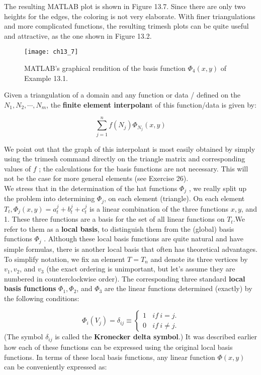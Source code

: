 \documentclass[../main.tex]{subfiles}
\begin{document}
The resulting MATLAB plot is shown in Figure 13.7. Since there are only two 
heights for the edges, the coloring is not very elaborate. With finer triangulations and more complicated functions, the resulting trimesh plots can be quite useful and attractive, as the one shown in Figure 13.2. 

\begin{figure}[H]
	\centering
	\texttt{[image: ch13\_7]}
	\caption{\textsf{MATLAB's graphical rendition of the basis function $\Phi_4(x,y)$ of Example 13.1. }}
	\label{pfig:ch13_7}
\end{figure}
Given a triangulation of a domain and any function or data / defined on the 
 $N_1, N_2, \cdots, N_m$, the \textbf{finite element interpolan}t of this function/data is given by: 

$$ \sum_{j=1}^{n} f(N_j) \Phi_{N_j}(x,y)$$

We point out that the graph of this interpolant is most easily obtained by simply using the trimesh command directly on the triangle matrix and corresponding values of $f$ ; the calculations for the basis functions are not necessary. This will not be the case for more general elements (see Exercise 26). 
\\

We stress that in the determination of the hat functions $\Phi_j$ , we really split up the problem into determining $\Phi_j$, on each element (triangle). On each element $T_t, \Phi_j(x,y)=a_t^j+b_t^j+c_t^j$ is a linear combination of the three functions $x,y$, and 1. These three functions are a basis for the set of all linear functions on $T_t$.We refer to them as a \textbf{local basis}, to distinguish them from the (global) basis functions $\Phi_j$ . Although these local basis functions are quite natural and have simple formulas, there is another local basis that often has theoretical advantages. To simplify notation, we fix an element $T = T_n$ and denote its three vertices by 
$v_1,v_2$, and $v_3$ (the exact ordering is unimportant, but let's assume they are numbered in counterclockwise order). The corresponding three standard \textbf{local basis functions} $\Phi _1,\Phi_2$, and $\Phi_3$ are the linear functions determined (exactly) by the following conditions: 

\begin{equation}\label{eqa7}
	\Phi_i(V_j)=\delta_{ij}\equiv 
			\begin{cases}
				1~~~~if~i=j.\\
				0~~~~if~i\neq j.
			\end{cases}
\end{equation}
(The symbol $\delta_{ij}$ is called the \textbf{Kronecker delta symbol}.) It was described earlier how each of these functions can be expressed using the original local basis functions. In terms of these local basis functions, any linear function $\Phi(x,y)$ can be conveniently expressed as:
\end{document}
